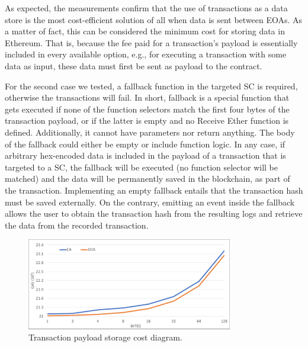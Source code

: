 As expected, the measurements confirm that the use of transactions as a data store is the most cost-efficient solution of all when data is sent between EOAs. As a matter of fact, this can be considered the minimum cost for storing data in Ethereum. That is, because the fee paid for a transaction’s payload is essentially included in every available option, e.g., for executing a transaction with some data as input, these data must first be sent as payload to the contract.

For the second case we tested, a fallback function in the targeted SC is required, otherwise the transactions will fail. In short, fallback is a special function that gets executed if none of the function selectors match the first four bytes of the transaction payload, or if the latter is empty and no Receive Ether function is defined. Additionally, it cannot have parameters nor return anything. The body of the fallback could either be empty or include function logic. In any case, if arbitrary hex-encoded data is included in the payload of a transaction that is targeted to a SC, the fallback will be executed (no function selector will be matched) and the data will be permanently saved in the blockchain, as part of the transaction. Implementing an empty fallback entails that the transaction hash must be saved externally. On the contrary, emitting an event inside the fallback allows the user to obtain the transaction hash from the resulting logs and retrieve the data from the recorded transaction.

\begin{figure}[htbp]
\centerline{\includegraphics[width=9cm]{figs/tx.pdf}}
\caption{Transaction payload storage cost diagram.}
\label{fig:tx}
\end{figure}

